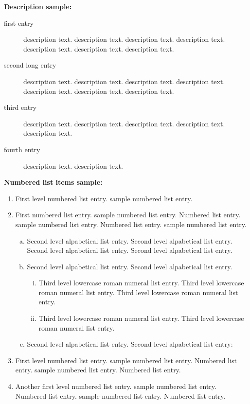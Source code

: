 \documentclass[CJCE,STIX2COL]{WileyNJD-v2}
\begin{document}
\noindent\textbf{Description sample:}

\begin{description}
\item[first entry] description text. description text. description text. description text. description text. description text. description text. 
\item[second long entry] description text. description text. description text. description text. description text. description text. description text. 
\item[third entry] description text. description text. description text. description text. description text. 
\item[fourth entry] description text. description text. 
\end{description}

\noindent\textbf{Numbered list items sample:}

\begin{enumerate}[1.]
\item First level numbered list entry. sample numbered list entry. 

\item First numbered list entry. sample numbered list entry. Numbered list entry. sample numbered list entry. Numbered list entry. sample numbered list entry. 

\begin{enumerate}[(a)]
\item Second level alpabetical list entry. Second level alpabetical list entry. Second level alpabetical list entry. Second level alpabetical list entry. 

\item Second level alpabetical list entry. Second level alpabetical list entry.

\begin{enumerate}[ii.]
\item Third level lowercase roman numeral list entry. Third level lowercase roman numeral list entry. Third level lowercase roman numeral list entry. 

\item Third level lowercase roman numeral list entry. Third level lowercase roman numeral list entry.
\end{enumerate}

\item Second level alpabetical list entry. Second level alpabetical list entry\cite{Blanchard2015}:
\end{enumerate}

\item First level numbered list entry. sample numbered list entry. Numbered list entry. sample numbered list entry. Numbered list entry. 

\item Another first level numbered list entry. sample numbered list entry. Numbered list entry. sample numbered list entry. Numbered list entry. 
\end{enumerate}
\end{document}
